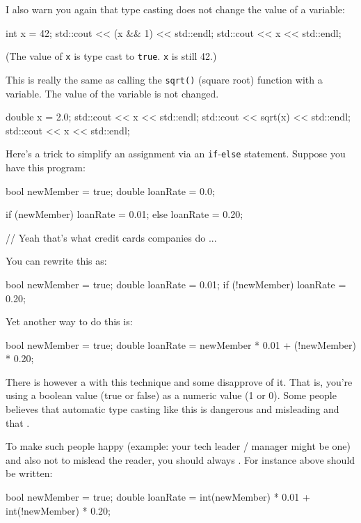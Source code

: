 
I also warn you again that type casting does not change the value of a
variable:\\
\begin{console}
int x = 42;
std::cout << (x && 1) << std::endl;
std::cout << x << std::endl; 
\end{console}

(The value of \texttt{x} is type cast to \texttt{true}. \texttt{x} is still 42.)

This is really the same as calling the \texttt{sqrt()} (square root) function with a variable. The value of the variable is not changed.
\begin{console}
double x = 2.0;
std::cout << x << std::endl;
std::cout << sqrt(x) << std::endl;
std::cout << x << std::endl; 
\end{console}
\newpage{}

Here's a trick to simplify an assignment via an
\texttt{if}-\texttt{else} statement. Suppose you have this program:\\
\begin{console}
bool newMember = true;
double loanRate = 0.0;

if (newMember)
   loanRate = 0.01;
else
   loanRate = 0.20;

// Yeah that's what credit cards companies do ... 
\end{console}

You can rewrite this as:
\begin{console}
bool newMember = true;
double loanRate = 0.01;
if (!newMember)
   loanRate = 0.20; 
\end{console}

Yet another way to do this is:
\begin{console}
bool newMember = true;
double loanRate = newMember * 0.01
                  + (!newMember) * 0.20; 
\end{console}

There is however a  with this technique and some disapprove of it. That is, you're using a boolean value (true or false) as a numeric value (1 or 0). Some people believes that automatic type casting like this is dangerous and misleading and that .

To make such people happy (example: your tech leader / manager might be one) and also not to mislead the reader, you should always . For instance above should be written:\\
\begin{console}
bool newMember = true;
double loanRate = int(newMember) * 0.01
                  + int(!newMember) * 0.20; 
\end{console}

